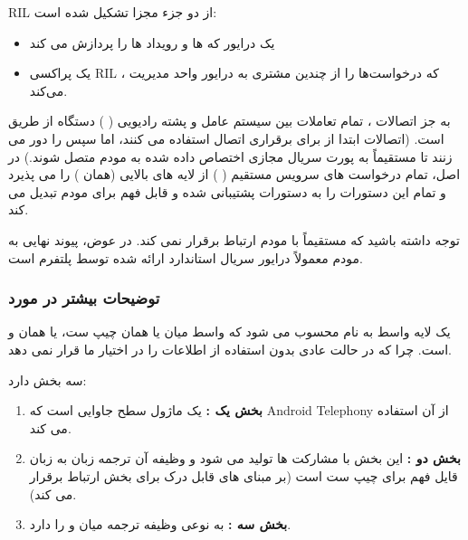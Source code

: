 \documentclass[landscape, 12pt]{report}
\begin{document}
            RIL
             از دو جزء مجزا تشکیل شده است: 
             \begin{itemize}
             	\item  یک درایور 
             	 که 
             	 ها و رویداد ها را پردازش می کند
             	\item یک پراکسی 
             	RIL
             	، که درخواست‌ها را از چندین مشتری به درایور 
             	 واحد مدیریت می‌کند. 
             \end{itemize}
             به جز اتصالات 
             ، تمام تعاملات بین سیستم عامل 
             و 
             پشته رادیویی (
             )
              دستگاه از طریق 
               است. (اتصالات
                 ابتدا از
                   برای برقراری اتصال استفاده می کنند، اما سپس 
                    را دور می زنند تا مستقیماً به پورت سریال مجازی اختصاص داده شده به مودم متصل شوند.) در اصل،
                      تمام درخواست های سرویس مستقیم (
                      ) از لایه های بالایی (همان 
                      ) را می پذیرد و تمام این دستورات را به دستورات پشتیبانی شده و قابل فهم برای مودم تبدیل می کند.
            
            توجه داشته باشید که
              مستقیماً با مودم ارتباط برقرار نمی کند. در عوض، پیوند نهایی به مودم معمولاً درایور سریال استاندارد ارائه شده توسط پلتفرم
                است.
                
   \subsubsection*{توضیحات بیشتر در مورد 
   }
    یک لایه واسط به نام 
     محسوب می شود 
     که واسط میان
       یا همان چیپ ست، 
       یا همان
        و
          ‌است.  
   چرا که 
   در حالت عادی بدون استفاده از
    اطلاعات را در اختیار ما قرار نمی دهد.
    
     سه بخش دارد:
     \begin{enumerate}
     	\item
 \textbf{بخش یک
 :
 }
   یک ماژول سطح جاوایی است که
    Android Telephony
     از آن استفاده می کند.
     \item
\textbf{بخش دو
:
}
این بخش با مشارکت 
   ها تولید می شود و وظیفه آن ترجمه زبان
    به زبان قایل فهم برای چیپ ست است (بر مبنای
      های قابل درک برای بخش
        ارتباط برقرار می کند).
\item \textbf{بخش سه
:
}
  به نوعی وظیفه ترجمه میان
    و
      را دارد.
     \end{enumerate}
  
\end{document}
